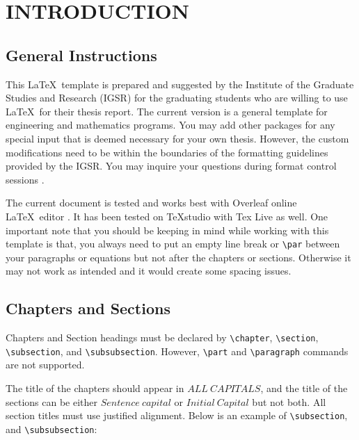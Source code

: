 \chapter{INTRODUCTION}\label{ch:introduction}

\section{General Instructions}\label{sec:generalinstructions}
This \LaTeX~template is prepared and suggested  by the Institute of the Graduate Studies and Research (IGSR) for the graduating students who are willing to use \LaTeX~for their thesis report. The current version is a general template for engineering and mathematics programs. You may add other packages for any special input that is deemed necessary for your own thesis. However, the custom modifications need to be within the boundaries of the formatting guidelines provided by the IGSR. You may inquire your questions during format control sessions \cite{igsr}.

The current document is tested and works best with Overleaf online \LaTeX~editor \cite{overleaf}. It has been tested on TeXstudio with Tex Live as well. One important note that you should be keeping in mind while working with this template is that, you always need to put an empty line break or \texttt{\textbackslash{par}} between your paragraphs or equations but not after the chapters or sections. Otherwise it may not work as intended and it would create some spacing issues.

\section{Chapters and Sections}\label{sec:chaptersnadsections}
Chapters and Section headings must be declared by \texttt{\textbackslash{chapter}}, \texttt{\textbackslash{section}}, \texttt{\textbackslash{subsection}}, and \texttt{\textbackslash{subsubsection}}. However, \texttt{\textbackslash{part}} and \texttt{\textbackslash{paragraph}} commands are not supported.

The title of the chapters should appear in $ALL~CAPITALS$, and the title of the sections can be either $Sentence~capital$ or $Initial~Capital$ but not both. All section titles must use justified alignment. Below is an example of \texttt{\textbackslash{subsection}}, and \texttt{\textbackslash{subsubsection}}:


